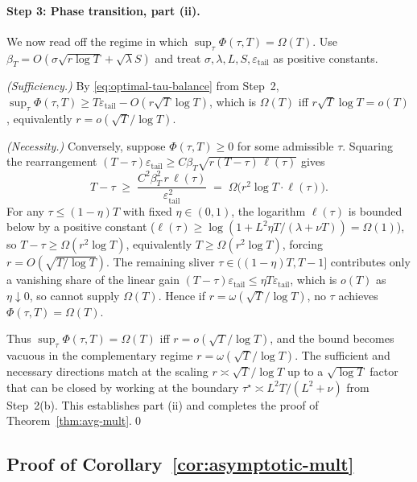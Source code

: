 \documentclass{article}
\theoremstyle{definition}
\theoremstyle{remark}
\theoremstyle{remark}
\begin{document}
\paragraph{Step 3: Phase transition, part (ii).}
We now read off the regime in which $\sup_\tau\Phi(\tau,T)=\Omega(T)$.
Use $\beta_T=O(\sigma\sqrt{r\log T}+\sqrt{\lambda}S)$ and treat
$\sigma,\lambda,L,S,\varepsilon_{\mathrm{tail}}$ as positive constants.

\emph{(Sufficiency.)} By \eqref{eq:optimal-tau-balance} from Step~2,
$\sup_\tau\Phi(\tau,T)\ge T\varepsilon_{\mathrm{tail}}-O(r\sqrt T\log T)$,
which is $\Omega(T)$ iff $r\sqrt T\log T=o(T)$, equivalently
$r=o(\sqrt T/\log T)$.

\emph{(Necessity.)} Conversely, suppose $\Phi(\tau,T)\ge 0$ for some
admissible $\tau$. Squaring the rearrangement
$(T-\tau)\varepsilon_{\mathrm{tail}}\ge C\beta_T\sqrt{r(T-\tau)\,\ell(\tau)}$
gives
\[
T-\tau\;\ge\;\frac{C^2\beta_T^2\,r\,\ell(\tau)}{\varepsilon_{\mathrm{tail}}^2}
\;=\;\Omega\!\bigl(r^2\log T\cdot \ell(\tau)\bigr).
\]
For any $\tau\le(1-\eta)T$ with fixed $\eta\in(0,1)$, the logarithm
$\ell(\tau)$ is bounded below by a positive constant
($\ell(\tau)\ge\log(1+L^2\eta T/(\lambda+\nu T))=\Omega(1)$),
so $T-\tau\ge\Omega(r^2\log T)$, equivalently
$T\ge\Omega(r^2\log T)$, forcing $r=O(\sqrt{T/\log T})$. The remaining
sliver $\tau\in((1-\eta)T,T-1]$ contributes only a vanishing share of the
linear gain $(T-\tau)\varepsilon_{\mathrm{tail}}\le\eta T\varepsilon_{\mathrm{tail}}$,
which is $o(T)$ as $\eta\downarrow 0$, so cannot supply $\Omega(T)$.
Hence if $r=\omega(\sqrt T/\log T)$, no $\tau$ achieves $\Phi(\tau,T)=\Omega(T)$.

Thus $\sup_\tau\Phi(\tau,T)=\Omega(T)$ iff $r=o(\sqrt T/\log T)$, and the
bound becomes vacuous in the complementary regime
$r=\omega(\sqrt T/\log T)$. The sufficient and necessary directions match
at the scaling $r\asymp\sqrt T/\log T$ up to a $\sqrt{\log T}$ factor that
can be closed by working at the boundary
$\tau^\star\asymp L^2T/(L^2+\nu)$ from Step~2(b). This establishes part
(ii) and completes the proof of Theorem~\ref{thm:avg-mult}.\qed

\subsection{Proof of Corollary~\ref{cor:asymptotic-mult}}
\label{app:proof-asymptotic-mult}
\end{document}
